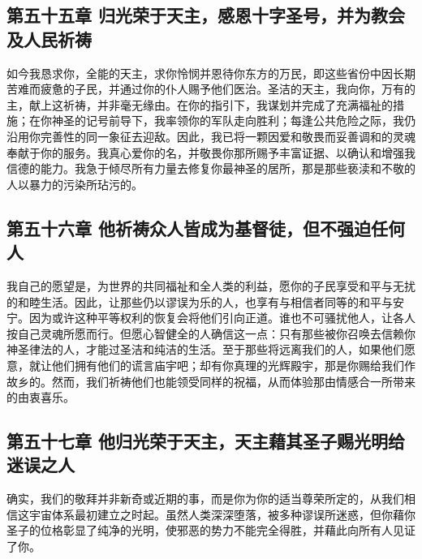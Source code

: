 
\subsection{第五十五章 归光荣于天主，感恩十字圣号，并为教会及人民祈祷}

如今我恳求你，全能的天主，求你怜悯并恩待你东方的万民，即这些省份中因长期苦难而疲惫的子民，并通过你的仆人赐予他们医治。圣洁的天主，我向你，万有的主，献上这祈祷，并非毫无缘由。在你的指引下，我谋划并完成了充满福祉的措施；在你神圣的记号前导下，我率领你的军队走向胜利；每逢公共危险之际，我仍沿用你完善性的同一象征去迎敌。因此，我已将一颗因爱和敬畏而妥善调和的灵魂奉献于你的服务。我真心爱你的名，并敬畏你那所赐予丰富证据、以确认和增强我信德的能力。我急于倾尽所有力量去修复你最神圣的居所，那是那些亵渎和不敬的人以暴力的污染所玷污的。\par


\subsection{第五十六章 他祈祷众人皆成为基督徒，但不强迫任何人}

我自己的愿望是，为世界的共同福祉和全人类的利益，愿你的子民享受和平与无扰的和睦生活。因此，让那些仍以谬误为乐的人，也享有与相信者同等的和平与安宁。因为或许这种平等权利的恢复会将他们引向正道。谁也不可骚扰他人，让各人按自己灵魂所愿而行。但愿心智健全的人确信这一点：只有那些被你召唤去信赖你神圣律法的人，才能过圣洁和纯洁的生活。至于那些将远离我们的人，如果他们愿意，就让他们拥有他们的谎言庙宇吧；却有你真理的光辉殿宇，那是你赐给我们作故乡的。然而，我们祈祷他们也能领受同样的祝福，从而体验那由情感合一所带来的由衷喜乐。\par


\subsection{第五十七章 他归光荣于天主，天主藉其圣子赐光明给迷误之人}

确实，我们的敬拜并非新奇或近期的事，而是你为你的适当尊荣所定的，从我们相信这宇宙体系最初建立之时起。虽然人类深深堕落，被多种谬误所迷惑，但你藉你圣子的位格彰显了纯净的光明，使邪恶的势力不能完全得胜，并藉此向所有人见证了你。\par

